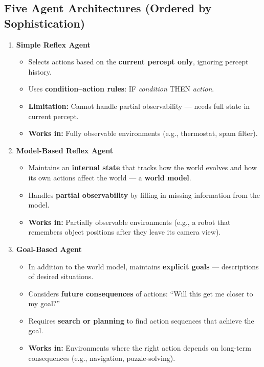 \documentclass[12pt, a4paper]{article}
\begin{document}
\subsection{Five Agent Architectures (Ordered by Sophistication)}

\begin{enumerate}[leftmargin=1.2cm, itemsep=6pt]

  \item \textbf{Simple Reflex Agent}
  \begin{itemize}[noitemsep]
    \item Selects actions based on the \textbf{current percept only}, ignoring percept history.
    \item Uses \textbf{condition–action rules}: IF \textit{condition} THEN \textit{action}.
    \item \textbf{Limitation:} Cannot handle partial observability — needs full state in current percept.
    \item \textbf{Works in:} Fully observable environments (e.g., thermostat, spam filter).
  \end{itemize}

  \item \textbf{Model-Based Reflex Agent}
  \begin{itemize}[noitemsep]
    \item Maintains an \textbf{internal state} that tracks how the world evolves and how its own actions affect the world — a \textbf{world model}.
    \item Handles \textbf{partial observability} by filling in missing information from the model.
    \item \textbf{Works in:} Partially observable environments (e.g., a robot that remembers object positions after they leave its camera view).
  \end{itemize}

  \item \textbf{Goal-Based Agent}
  \begin{itemize}[noitemsep]
    \item In addition to the world model, maintains \textbf{explicit goals} — descriptions of desired situations.
    \item Considers \textbf{future consequences} of actions: ``Will this get me closer to my goal?''
    \item Requires \textbf{search or planning} to find action sequences that achieve the goal.
    \item \textbf{Works in:} Environments where the right action depends on long-term consequences (e.g., navigation, puzzle-solving).
  \end{itemize}


\end{enumerate}
\end{document}
